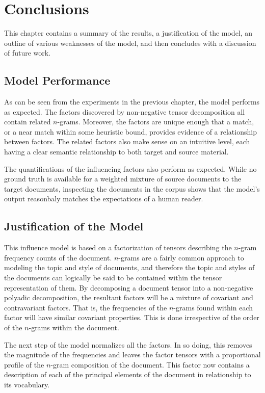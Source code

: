\documentclass[../ut-dissertation.tex]{subfiles}
\begin{document}
\chapter{Conclusions}
This chapter contains a summary of the results, a justification of the
model, an outline of various weaknesses of the model, and then
concludes with a discussion of future work.

\section{Model Performance}
As can be seen from the experiments in the previous chapter, the model
performs as expected.  The factors discovered by non-negative tensor
decomposition all contain related $n$-grams.  Moreover, the factors
are unique enough that a match, or a near match within some heuristic
bound, provides evidence of a relationship between factors.  The
related factors also make sense on an intuitive level, each having a
clear semantic relationship to both target and source material.

The quantifications of the influencing factors also perform as
expected.  While no ground truth is available for a weighted mixture
of source documents to the target documents, inspecting the documents
in the corpus shows that the model's output reasonbaly matches the
expectations of a human reader.


\section{Justification of the Model}
This influence model is based on a factorization of tensors describing
the $n$-gram frequency counts of the document.  $n$-grams are a fairly
common approach to modeling the topic and style of documents, and
therefore the topic and styles of the documents can logically be said
to be contained within the tensor representation of them.  By
decomposing a document tensor into a non-negative polyadic
decomposition, the resultant factors will be a mixture of covariant
and contravariant factors.  That is, the frequencies of the $n$-grams
found within each factor will have similar covariant properties.  This
is done irrespective of the order of the $n$-grams within the
document.

The next step of the model normalizes all the factors.  In so doing,
this removes the magnitude of the frequencies and leaves the factor
tensors with a proportional profile of the $n$-gram composition of the
document.  This factor now contains a description of each of the
principal elements of the document in relationship to its vocabulary.
\end{document}
